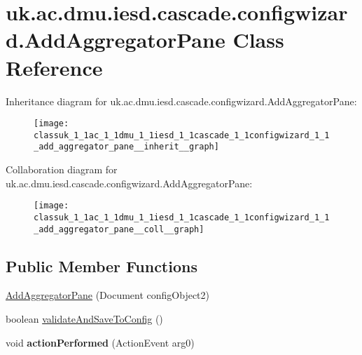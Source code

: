 \hypertarget{classuk_1_1ac_1_1dmu_1_1iesd_1_1cascade_1_1configwizard_1_1_add_aggregator_pane}{\section{uk.\-ac.\-dmu.\-iesd.\-cascade.\-configwizard.\-Add\-Aggregator\-Pane Class Reference}
\label{classuk_1_1ac_1_1dmu_1_1iesd_1_1cascade_1_1configwizard_1_1_add_aggregator_pane}
}


Inheritance diagram for uk.\-ac.\-dmu.\-iesd.\-cascade.\-configwizard.\-Add\-Aggregator\-Pane\-:\nopagebreak
\begin{figure}[H]
\begin{center}
\leavevmode
\texttt{[image: classuk\_1\_1ac\_1\_1dmu\_1\_1iesd\_1\_1cascade\_1\_1configwizard\_1\_1\_add\_aggregator\_pane\_\_inherit\_\_graph]}
\end{center}
\end{figure}


Collaboration diagram for uk.\-ac.\-dmu.\-iesd.\-cascade.\-configwizard.\-Add\-Aggregator\-Pane\-:\nopagebreak
\begin{figure}[H]
\begin{center}
\leavevmode
\texttt{[image: classuk\_1\_1ac\_1\_1dmu\_1\_1iesd\_1\_1cascade\_1\_1configwizard\_1\_1\_add\_aggregator\_pane\_\_coll\_\_graph]}
\end{center}
\end{figure}
\subsection*{Public Member Functions}
\begin{DoxyCompactItemize}
\item 
\hyperlink{classuk_1_1ac_1_1dmu_1_1iesd_1_1cascade_1_1configwizard_1_1_add_aggregator_pane_af39c05b724fd6c360cdfce56c5a549e0}{Add\-Aggregator\-Pane} (Document config\-Object2)
\item 
boolean \hyperlink{classuk_1_1ac_1_1dmu_1_1iesd_1_1cascade_1_1configwizard_1_1_add_aggregator_pane_af68041128cfbb88077602aaeaea4316f}{validate\-And\-Save\-To\-Config} ()
\item 
\hypertarget{classuk_1_1ac_1_1dmu_1_1iesd_1_1cascade_1_1configwizard_1_1_add_aggregator_pane_a1bc4c67dd76376e270bbc7fbee9f0b79}{void {\bfseries action\-Performed} (Action\-Event arg0)}\label{classuk_1_1ac_1_1dmu_1_1iesd_1_1cascade_1_1configwizard_1_1_add_aggregator_pane_a1bc4c67dd76376e270bbc7fbee9f0b79}

\end{DoxyCompactItemize}
